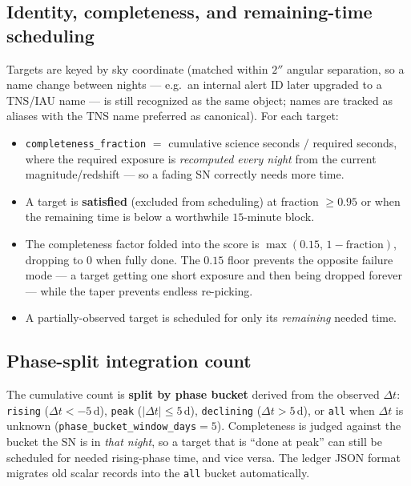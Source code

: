 \documentclass[11pt,letterpaper]{article}
\begin{document}
\subsection{Identity, completeness, and remaining-time scheduling}
Targets are keyed by sky coordinate (matched within $2''$ angular separation, so a name
change between nights --- e.g.\ an internal alert ID later upgraded to a TNS/IAU name --- is
still recognized as the same object; names are tracked as aliases with the TNS name
preferred as canonical). For each target:
\begin{itemize}[nosep]
  \item \texttt{completeness\_fraction} $=$ cumulative science seconds $/$ required seconds,
  where the required exposure is \emph{recomputed every night} from the current
  magnitude/redshift --- so a fading SN correctly needs more time.
  \item A target is \textbf{satisfied} (excluded from scheduling) at fraction $\ge0.95$ or
  when the remaining time is below a worthwhile $15$-minute block.
  \item The completeness factor folded into the score is
  $\max(0.15,\,1-\text{fraction})$, dropping to $0$ when fully done. The $0.15$ floor
  prevents the opposite failure mode --- a target getting one short exposure and then being
  dropped forever --- while the taper prevents endless re-picking.
  \item A partially-observed target is scheduled for only its \emph{remaining} needed time.
\end{itemize}

\subsection{Phase-split integration count}
The cumulative count is \textbf{split by phase bucket} derived from the observed $\Delta t$:
\texttt{rising} ($\Delta t < -5$\,d), \texttt{peak} ($|\Delta t|\le5$\,d), \texttt{declining}
($\Delta t > 5$\,d), or \texttt{all} when $\Delta t$ is unknown
(\texttt{phase\_bucket\_window\_days}$=5$). Completeness is judged against the bucket the SN
is in \emph{that night}, so a target that is ``done at peak'' can still be scheduled for
needed rising-phase time, and vice versa. The ledger JSON format migrates old scalar records
into the \texttt{all} bucket automatically.
\end{document}
